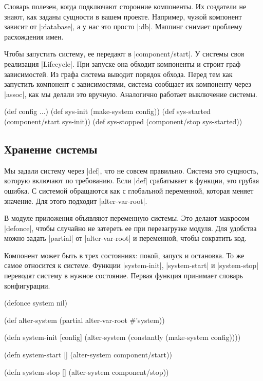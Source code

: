 Словарь полезен, когда подключают сторонние компоненты. Их создатели не знают,
как заданы сущности в вашем проекте. Например, чужой компонент зависит от
\spverb|:database|, а у нас это просто \spverb|:db|. Маппинг снимает проблему
расхождения имен.

Чтобы запустить систему, ее передают в \spverb|component/start|. У системы своя
реализация \spverb|Lifecycle|. При запуске она обходит компоненты и строит граф
зависимостей. Из графа система выводит порядок обхода. Перед тем как запустить
компонент с зависимостями, система сообщает их компоненту через \spverb|assoc|,
как мы делали это вручную. Аналогично работает выключение системы.

\begin{english}
  \begin{clojure}
(def config {...})
(def sys-init (make-system config))
(def sys-started (component/start sys-init))
(def sys-stopped (component/stop sys-started))
  \end{clojure}
\end{english}

\subsection{Хранение системы}

Мы задали систему через \spverb|def|, что не совсем правильно. Система это
сущность, которую включают по требованию. Если \spverb|def| срабатывает в
функции, это грубая ошибка. С системой обращаются как с глобальной переменной,
которая меняет значение. Для этого подходит \spverb|alter-var-root|.

В модуле приложения объявляют переменную системы. Это делают макросом
\spverb|defonce|, чтобы случайно не затереть ее при перезагрузке модуля. Для
удобства можно задать \spverb|partial| от \spverb|alter-var-root| и переменной,
чтобы сократить код.

Компонент может быть в трех состояниях: покой, запуск и остановка. То же самое
относится к системе. Функции \spverb|system-init|, \spverb|system-start| и
\spverb|system-stop| переводят систему в нужное состояние. Первая функция
принимает словарь конфигурации.

\begin{english}
  \begin{clojure}
(defonce system nil)

(def alter-system (partial alter-var-root #'system))

(defn system-init [config]
  (alter-system (constantly (make-system config))))

(defn system-start []
  (alter-system component/start))

(defn system-stop []
  (alter-system component/stop))
  \end{clojure}
\end{english}

